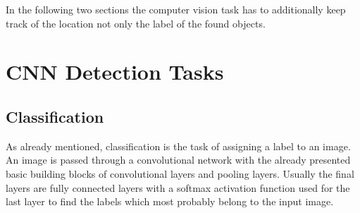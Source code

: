 %
%
%
%



In the following two sections the computer vision task has to additionally keep track of the location
not only the label of the found objects.
\section{CNN Detection Tasks}
\subsection{Classification}
\label{classification}
As already mentioned, classification is the task of assigning a label to an image.
An image is passed through a convolutional network with the already presented basic building blocks of convolutional
layers and pooling layers.
Usually the final layers are fully connected layers with a softmax activation function
used for the last layer to find the labels which most probably belong to the input image.
